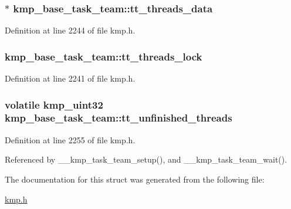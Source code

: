 \hypertarget{structkmp__base__task__team_a7433d86baf0395d71012878399e63bde}{
\subsubsection[{tt\-\_\-threads\-\_\-data}]{$\ast$ kmp\-\_\-base\-\_\-task\-\_\-team\-::tt\-\_\-threads\-\_\-data}}\label{structkmp__base__task__team_a7433d86baf0395d71012878399e63bde}


Definition at line 2244 of file kmp.\-h.

\hypertarget{structkmp__base__task__team_a2cb1e2598ab59f4d56f066d730ed98fe}{
\subsubsection[{tt\-\_\-threads\-\_\-lock}]{ kmp\-\_\-base\-\_\-task\-\_\-team\-::tt\-\_\-threads\-\_\-lock}}\label{structkmp__base__task__team_a2cb1e2598ab59f4d56f066d730ed98fe}


Definition at line 2241 of file kmp.\-h.

\hypertarget{structkmp__base__task__team_a01de70849591effdf315bfc233c6ba1a}{
\subsubsection[{tt\-\_\-unfinished\-\_\-threads}]{ volatile kmp\-\_\-uint32 kmp\-\_\-base\-\_\-task\-\_\-team\-::tt\-\_\-unfinished\-\_\-threads}}\label{structkmp__base__task__team_a01de70849591effdf315bfc233c6ba1a}


Definition at line 2255 of file kmp.\-h.



Referenced by \-\_\-\-\_\-kmp\-\_\-task\-\_\-team\-\_\-setup(), and \-\_\-\-\_\-kmp\-\_\-task\-\_\-team\-\_\-wait().



The documentation for this struct was generated from the following file\-:\begin{DoxyCompactItemize}
\item 
\hyperlink{kmp_8h}{kmp.\-h}\end{DoxyCompactItemize}
